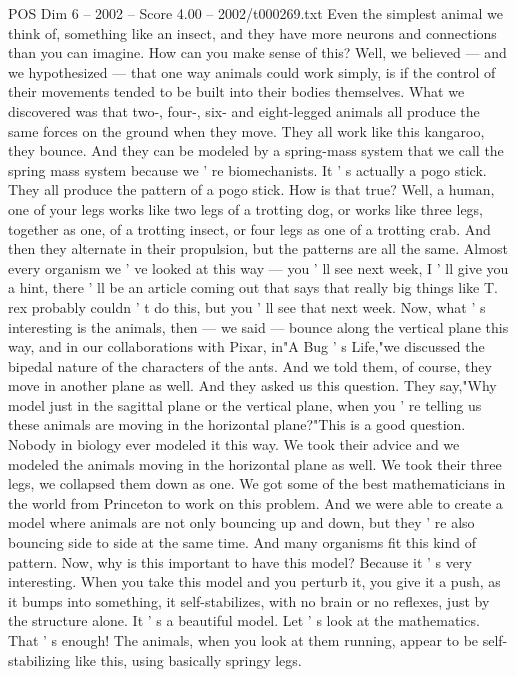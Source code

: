 \begin{textsample}{POS Dim 6 – 2002 – Score 4.00 – 2002/t000269.txt}
Even the simplest animal we think of, something like an insect, and they have more neurons and connections than you can imagine.
How can you make sense of this?
Well, we believed — and we hypothesized — that one way animals could work simply, is if the control of their movements tended to be built into their bodies themselves.
What we discovered was that two-, four-, six- and eight-legged animals all produce the same forces on the ground when they move.
They all work like this kangaroo, they bounce.
And they can be modeled by a spring-mass system that we call the spring mass system because we ' re biomechanists.
It ' s actually a pogo stick.
They all produce the pattern of a pogo stick.
How is that true?
Well, a human, one of your legs works like two legs of a trotting dog, or works like three legs, together as one, of a trotting insect, or four legs as one of a trotting crab.
And then they alternate in their propulsion, but the patterns are all the same.
Almost every organism we ' ve looked at this way — you ' ll see next week, I ' ll give you a hint, there ' ll be an article coming out that says that really big things like T. rex probably couldn ' t do this, but you ' ll see that next week.
Now, what ' s interesting is the animals, then — we said — bounce along the vertical plane this way, and in our collaborations with Pixar, in"A Bug ' s Life,"we discussed the bipedal nature of the characters of the ants.
And we told them, of course, they move in another plane as well.
And they asked us this question.
They say,"Why model just in the sagittal plane or the vertical plane, when you ' re telling us these animals are moving in the horizontal plane?"This is a good question.
Nobody in biology ever modeled it this way.
We took their advice and we modeled the animals moving in the horizontal plane as well.
We took their three legs, we collapsed them down as one.
We got some of the best mathematicians in the world from Princeton to work on this problem.
And we were able to create a model where animals are not only bouncing up and down, but they ' re also bouncing side to side at the same time.
And many organisms fit this kind of pattern.
Now, why is this important to have this model?
Because it ' s very interesting.
When you take this model and you perturb it, you give it a push, as it bumps into something, it self-stabilizes, with no brain or no reflexes, just by the structure alone.
It ' s a beautiful model.
Let ' s look at the mathematics.
That ' s enough!
The animals, when you look at them running, appear to be self-stabilizing like this, using basically springy legs.

\end{textsample}
